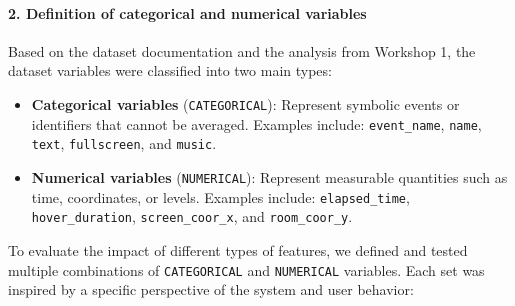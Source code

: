 \documentclass[12pt]{article}
\begin{document}
	\paragraph{2. Definition of categorical and numerical variables}
	
	Based on the dataset documentation and the analysis from Workshop 1, the dataset variables were classified into two main types:
	
	\begin{itemize}
		\item \textbf{Categorical variables} (\texttt{CATEGORICAL}): Represent symbolic events or identifiers that cannot be averaged. Examples include: \texttt{event\_name}, \texttt{name}, \texttt{text}, \texttt{fullscreen}, and \texttt{music}.
		
		\item \textbf{Numerical variables} (\texttt{NUMERICAL}): Represent measurable quantities such as time, coordinates, or levels. Examples include: \texttt{elapsed\_time}, \texttt{hover\_duration}, \texttt{screen\_coor\_x}, and \texttt{room\_coor\_y}.
	\end{itemize}
	
	To evaluate the impact of different types of features, we defined and tested multiple combinations of \texttt{CATEGORICAL} and \texttt{NUMERICAL} variables. Each set was inspired by a specific perspective of the system and user behavior:
	
\end{document}

